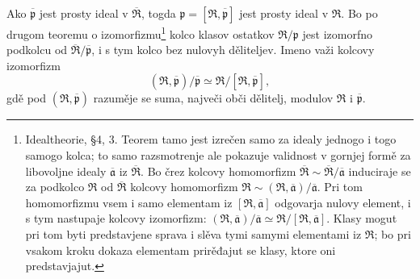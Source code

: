 \documentclass[11pt]{article}
\begin{document}
Ako $\overline{\mathfrak p}$ jest prosty ideal v $\overline{\mathfrak R}$, togda $\mathfrak p=[\mathfrak R,\overline{\mathfrak p}]$ jest prosty ideal v $\mathfrak R$. Bo po drugom teoremu o izomorfizmu\footnote{Idealtheorie, \S 4, 3. Teorem tamo jest izrečen samo za idealy jednogo i togo samogo kolca; to samo razsmotrenje ale pokazuje validnost v gornjej formě za libovoljne idealy $\overline{\mathfrak a}$ iz $\overline{\mathfrak R}$. Bo črez kolcovy homomorfizm $\overline{\mathfrak R}\sim\overline{\mathfrak R}/\overline{\mathfrak a}$ induciraje se za podkolco $\mathfrak R$ od $\overline{\mathfrak R}$ kolcovy homomorfizm $\mathfrak R\sim(\mathfrak R,\overline{\mathfrak a})/\overline{\mathfrak a}$. Pri tom homomorfizmu vsem i samo elementam iz $[\mathfrak R,\overline{\mathfrak a}]$ odgovarja nulovy element, i s tym nastupaje kolcovy izomorfizm: $(\mathfrak R,\overline{\mathfrak a})/\overline{\mathfrak a}\simeq \mathfrak R/[\mathfrak R,\overline{\mathfrak a}]$. Klasy mogut pri tom byti predstavjene sprava i slěva tymi samymi elementami iz $\mathfrak R$; bo pri vsakom kroku dokaza elementam prirěđajut se klasy, ktore oni predstavjajut.} kolco klasov ostatkov $\mathfrak R/\mathfrak p$ jest izomorfno podkolcu od $\overline{\mathfrak R}/\overline{\mathfrak p}$, i s tym kolco bez nulovyh děliteljev. Imeno važi kolcovy izomorfizm
\[
   (\mathfrak R,\overline{\mathfrak p})/\overline{\mathfrak p}
      \simeq \mathfrak R/[\mathfrak R,\overline{\mathfrak p}],
\]
gdě pod $(\mathfrak R,\overline{\mathfrak p})$ razuměje se suma, največi obči dělitelj, modulov $\mathfrak R$ i $\overline{\mathfrak p}$.
\end{document}
